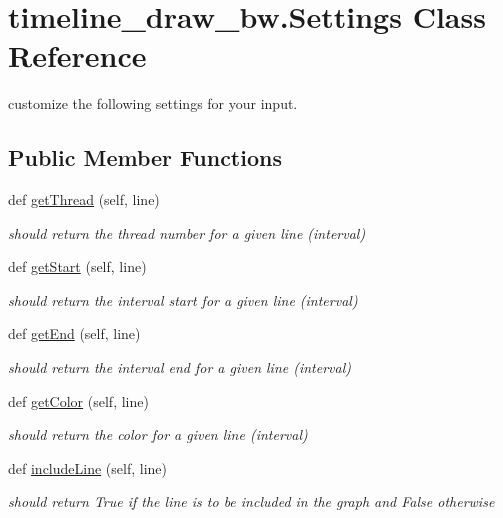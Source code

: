 \hypertarget{classtimeline__draw__bw_1_1Settings}{}\section{timeline\+\_\+draw\+\_\+bw.\+Settings Class Reference}
\label{classtimeline__draw__bw_1_1Settings}


customize the following settings for your input.  


\subsection*{Public Member Functions}
\begin{DoxyCompactItemize}
\item 
def \hyperlink{classtimeline__draw__bw_1_1Settings_a8f4a4dfe365bc55f55f3b3a8ef3524a3}{get\+Thread} (self, line)
\begin{DoxyCompactList}\small\item\em should return the thread number for a given line (interval) \end{DoxyCompactList}\item 
def \hyperlink{classtimeline__draw__bw_1_1Settings_a15ac4f74b26be5aaa7ff99efc9ef187a}{get\+Start} (self, line)
\begin{DoxyCompactList}\small\item\em should return the interval start for a given line (interval) \end{DoxyCompactList}\item 
def \hyperlink{classtimeline__draw__bw_1_1Settings_a18a9eae1f801909cc112e5401a1290d1}{get\+End} (self, line)
\begin{DoxyCompactList}\small\item\em should return the interval end for a given line (interval) \end{DoxyCompactList}\item 
def \hyperlink{classtimeline__draw__bw_1_1Settings_a173c1a3bf8d4ac4f607aff243ba06116}{get\+Color} (self, line)
\begin{DoxyCompactList}\small\item\em should return the color for a given line (interval) \end{DoxyCompactList}\item 
def \hyperlink{classtimeline__draw__bw_1_1Settings_a572fa3777fd6842b68033807657afe1d}{include\+Line} (self, line)
\begin{DoxyCompactList}\small\item\em should return True if the line is to be included in the graph and False otherwise \end{DoxyCompactList}\end{DoxyCompactItemize}

